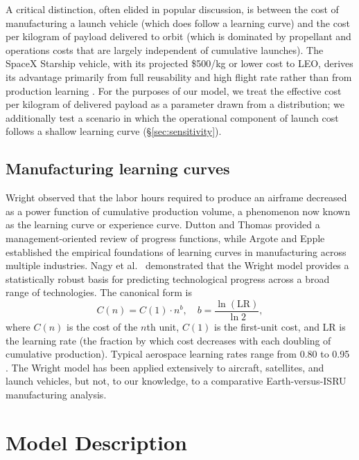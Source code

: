 \documentclass[preprint,12pt]{elsarticle}
\begin{document}
A critical distinction, often elided in popular discussion, is between the cost of manufacturing a launch vehicle (which does follow a learning curve) and the cost per kilogram of payload delivered to orbit (which is dominated by propellant and operations costs that are largely independent of cumulative launches). The SpaceX Starship vehicle, with its projected \$500/kg or lower cost to LEO, derives its advantage primarily from full reusability and high flight rate rather than from production learning \cite{spacex2023,jones2020}. For the purposes of our model, we treat the effective cost per kilogram of delivered payload as a parameter drawn from a distribution; we additionally test a scenario in which the operational component of launch cost follows a shallow learning curve (\S\ref{sec:sensitivity}).

\subsection{Manufacturing learning curves}

Wright \cite{wright1936} observed that the labor hours required to produce an airframe decreased as a power function of cumulative production volume, a phenomenon now known as the learning curve or experience curve. Dutton and Thomas \cite{dutton1984} provided a management-oriented review of progress functions, while Argote and Epple \cite{argote1990} established the empirical foundations of learning curves in manufacturing across multiple industries. Nagy et al.\ \cite{nagy2013} demonstrated that the Wright model provides a statistically robust basis for predicting technological progress across a broad range of technologies. The canonical form is
\begin{equation}
  C(n) = C(1) \cdot n^{b}, \quad b = \frac{\ln(\text{LR})}{\ln 2},
  \label{eq:wright}
\end{equation}
where $C(n)$ is the cost of the $n$th unit, $C(1)$ is the first-unit cost, and LR is the learning rate (the fraction by which cost decreases with each doubling of cumulative production). Typical aerospace learning rates range from 0.80 to 0.95 \cite{wertz2011}. The Wright model has been applied extensively to aircraft, satellites, and launch vehicles, but not, to our knowledge, to a comparative Earth-versus-ISRU manufacturing analysis.

\section{Model Description}
\label{sec:model}
\end{document}
